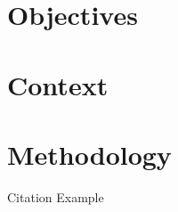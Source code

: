 \pagestyle{fancy}
\renewcommand{\headrulewidth}{0pt}


\section{Objectives}


\section{Context}


\section{Methodology}

Citation Example~\citep{mckenzie2015poi}